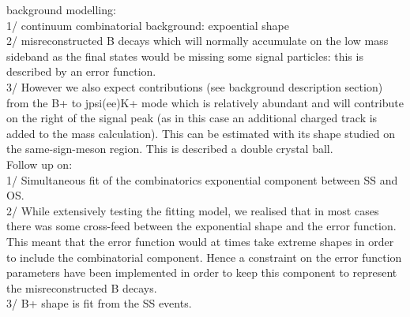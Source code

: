 background modelling:\\
1/ continuum combinatorial background: expoential shape\\
2/ misreconstructed B decays which will normally accumulate on the low mass sideband
as the final states would be missing some signal particles: this is described by an error
function.\\
3/ However we also expect contributions (see background description section) from the
B+ to jpsi(ee)K+ mode which is relatively abundant and will contribute on the right
of the signal peak (as in this case an additional charged track is added to the mass
calculation).
This can be estimated with its shape studied on the same-sign-meson region.
This is described a double crystal ball.\\

Follow up on:\\
1/ Simultaneous fit of the combinatorics exponential component between SS and OS.\\
2/ While extensively testing the fitting model, we realised that in most cases
there was some cross-feed between the exponential shape	and the	error function.
This meant that	the error function would at times take extreme shapes in order
to include the combinatorial component.	Hence a	constraint on the error function
parameters have	been implemented in order to keep this component to represent
the misreconstructed B decays.\\
3/ B+ shape is fit from	the SS events.
